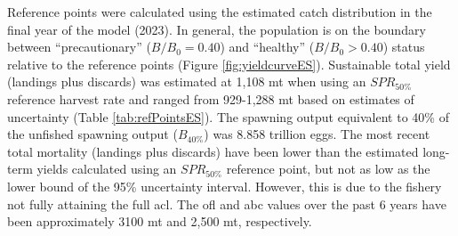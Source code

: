 \documentclass[11pt,
  english,
  letterpaper,
]{article}
\begin{document}
Reference points were calculated using the estimated catch distribution in the final year of the model (2023). In general, the population is on the boundary between ``precautionary'' (\(B/B_0 = 0.40\)) and ``healthy'' (\(B/B_0 > 0.40\)) status relative to the reference points (Figure \ref{fig:yieldcurveES}). Sustainable total yield (landings plus discards) was estimated at 1,108 mt when using an \(SPR_{50\%}\) reference harvest rate and ranged from 929-1,288 mt based on estimates of uncertainty (Table \ref{tab:refPointsES}). The spawning output equivalent to 40\% of the unfished spawning output (\(B_{40\%}\)) was 8.858 trillion eggs. The most recent total mortality (landings plus discards) have been lower than the estimated long-term yields calculated using an \(SPR_{50\%}\) reference point, but not as low as the lower bound of the 95\% uncertainty interval. However, this is due to the fishery not fully attaining the full \gls{acl}. The \gls{ofl} and \gls{abc} values over the past 6 years have been approximately 3100 mt and 2,500 mt, respectively.

\begingroup\fontsize{10}{12}\selectfont
\begingroup\fontsize{10}{12}\selectfont
\end{document}
